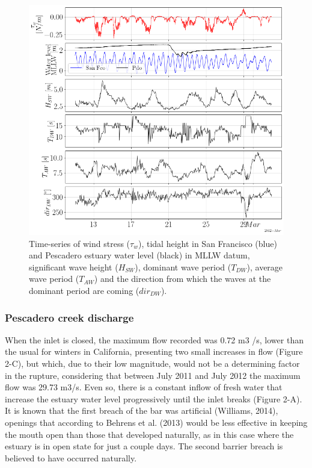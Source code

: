 \documentclass[11pt,letterpaper]{article}
\begin{document}
\begin{figure}[h!]
    \centering
    \includegraphics[scale=0.6]{Imagenes/wave1.png}
    \caption{Time-series of wind stress ($\tau_w$), tidal height in San Francisco (blue) and Pescadero estuary water level (black) in MLLW datum, significant wave height ($H_{SW}$), dominant wave period ($T_{DW}$), average wave period ($T_{AW}$) and the direction from which the waves at the dominant period are coming ($dir_{DW}$).}
    \label{fig:wave1}
\end{figure}

\subsubsection{Pescadero creek discharge}

When the inlet is closed, the maximum flow recorded was 0.72 m3 /s, lower than the usual for winters in California, presenting two small increases in flow (Figure 2-C), but which, due to their low magnitude, would not be a determining factor in the rupture, considering that between July 2011 and July 2012 the maximum flow was 29.73 m3/s. Even so, there is a constant inflow of fresh water that increase the estuary water level progressively until the inlet breaks (Figure 2-A). It is known that the first breach of the bar was artificial (Williams, 2014), openings that according to Behrens et al. (2013) would be less effective in keeping the mouth open than those that developed naturally, as in this case where the estuary is in open state for just a couple days. The second barrier breach is believed to have occurred naturally.  
\end{document}
